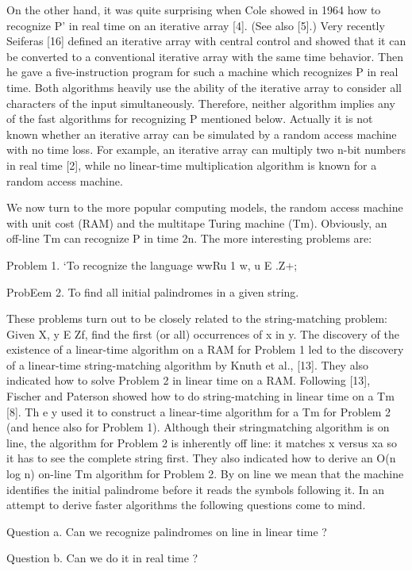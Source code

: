 \documentclass[11pt,a4paper]{report}
\begin{document}
On the other hand, it was quite surprising when Cole showed in 1964 how to recognize
P’ in real time on an iterative array [4]. (See also [5].) Very recently Seiferas [16] defined
an iterative array with central control and showed that it can be converted to a conventional
iterative array with the same time behavior. Then he gave a five-instruction program for
such a machine which recognizes P in real time. Both algorithms heavily use the ability
of the iterative array to consider all characters of the input simultaneously. Therefore,
neither algorithm implies any of the fast algorithms for recognizing P mentioned below.
Actually it is not known whether an iterative array can be simulated by a random access
machine with no time loss. For example, an iterative array can multiply two n-bit numbers
in real time [2], while no linear-time multiplication algorithm is known for a random
access machine.

We now turn to the more popular computing models, the random access machine
with unit cost (RAM) and the multitape Turing machine (Tm). Obviously, an off-line
Tm can recognize P in time 2n. The more interesting problems are:

Problem 1. ‘To recognize the language {wwRu 1 w, u E .Z+};

ProbEem 2. To find all initial palindromes in a given string.

These problems turn out to be closely related to the string-matching problem: Given X,
y E Zf, find the first (or all) occurrences of x in y. The discovery of the existence of a
linear-time algorithm on a RAM for Problem 1 led to the discovery of a linear-time
string-matching algorithm by Knuth et al., [13]. They also indicated how to solve
Problem 2 in linear time on a RAM. Following [13], Fischer and Paterson showed how
to do string-matching in linear time on a Tm [8]. Th e y used it to construct a linear-time
algorithm for a Tm for Problem 2 (and hence also for Problem 1). Although their stringmatching algorithm is on line, the algorithm for Problem 2 is inherently off line: it
matches x versus xa so it has to see the complete string first. They also indicated how to
derive an O(n log n) on-line Tm algorithm for Problem 2. By on line we mean that the
machine identifies the initial palindrome before it reads the symbols following it. In an
attempt to derive faster algorithms the following questions come to mind.

Question a. Can we recognize palindromes on line in linear time ?

Question b. Can we do it in real time ?
\end{document}
